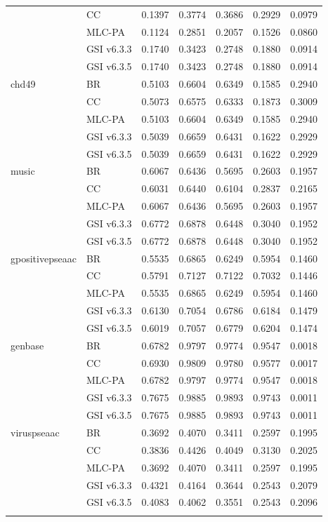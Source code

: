 \documentclass[11pt,a4paper,twoside]{article}
\begin{document}
\begin{landscape}
\begin{longtable}{llrrrrr}
 & CC & 0.1397 & 0.3774 & 0.3686 & 0.2929 & 0.0979 \\
 & MLC-PA & 0.1124 & 0.2851 & 0.2057 & 0.1526 & 0.0860 \\
 & GSI v6.3.3 & 0.1740 & 0.3423 & 0.2748 & 0.1880 & 0.0914 \\
 & GSI v6.3.5 & 0.1740 & 0.3423 & 0.2748 & 0.1880 & 0.0914 \\
\addlinespace[2pt]
chd49 & BR & 0.5103 & 0.6604 & 0.6349 & 0.1585 & 0.2940 \\
 & CC & 0.5073 & 0.6575 & 0.6333 & 0.1873 & 0.3009 \\
 & MLC-PA & 0.5103 & 0.6604 & 0.6349 & 0.1585 & 0.2940 \\
 & GSI v6.3.3 & 0.5039 & 0.6659 & 0.6431 & 0.1622 & 0.2929 \\
 & GSI v6.3.5 & 0.5039 & 0.6659 & 0.6431 & 0.1622 & 0.2929 \\
\addlinespace[2pt]
music & BR & 0.6067 & 0.6436 & 0.5695 & 0.2603 & 0.1957 \\
 & CC & 0.6031 & 0.6440 & 0.6104 & 0.2837 & 0.2165 \\
 & MLC-PA & 0.6067 & 0.6436 & 0.5695 & 0.2603 & 0.1957 \\
 & GSI v6.3.3 & 0.6772 & 0.6878 & 0.6448 & 0.3040 & 0.1952 \\
 & GSI v6.3.5 & 0.6772 & 0.6878 & 0.6448 & 0.3040 & 0.1952 \\
\addlinespace[2pt]
gpositivepseaac & BR & 0.5535 & 0.6865 & 0.6249 & 0.5954 & 0.1460 \\
 & CC & 0.5791 & 0.7127 & 0.7122 & 0.7032 & 0.1446 \\
 & MLC-PA & 0.5535 & 0.6865 & 0.6249 & 0.5954 & 0.1460 \\
 & GSI v6.3.3 & 0.6130 & 0.7054 & 0.6786 & 0.6184 & 0.1479 \\
 & GSI v6.3.5 & 0.6019 & 0.7057 & 0.6779 & 0.6204 & 0.1474 \\
\addlinespace[2pt]
genbase & BR & 0.6782 & 0.9797 & 0.9774 & 0.9547 & 0.0018 \\
 & CC & 0.6930 & 0.9809 & 0.9780 & 0.9577 & 0.0017 \\
 & MLC-PA & 0.6782 & 0.9797 & 0.9774 & 0.9547 & 0.0018 \\
 & GSI v6.3.3 & 0.7675 & 0.9885 & 0.9893 & 0.9743 & 0.0011 \\
 & GSI v6.3.5 & 0.7675 & 0.9885 & 0.9893 & 0.9743 & 0.0011 \\
\addlinespace[2pt]
viruspseaac & BR & 0.3692 & 0.4070 & 0.3411 & 0.2597 & 0.1995 \\
 & CC & 0.3836 & 0.4426 & 0.4049 & 0.3130 & 0.2025 \\
 & MLC-PA & 0.3692 & 0.4070 & 0.3411 & 0.2597 & 0.1995 \\
 & GSI v6.3.3 & 0.4321 & 0.4164 & 0.3644 & 0.2543 & 0.2079 \\
 & GSI v6.3.5 & 0.4083 & 0.4062 & 0.3551 & 0.2543 & 0.2096 \\
\addlinespace[2pt]
\bottomrule
\end{longtable}
\end{landscape}
\end{document}
